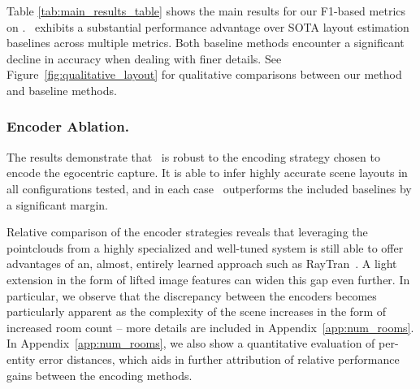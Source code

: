 Table \ref{tab:main_results_table} shows the main results for our F1-based metrics on \DatasetName{}. \METHOD~exhibits a substantial performance advantage over SOTA layout estimation baselines across multiple metrics. 
Both baseline methods encounter a significant decline in accuracy when dealing with finer details. See Figure~\ref{fig:qualitative_layout} for qualitative comparisons between our method and baseline methods. 


\subsubsection{Encoder Ablation.} 
The results demonstrate that \METHOD~is robust to the encoding strategy chosen to encode the egocentric capture. It is able to infer highly accurate scene layouts in all configurations tested, and in each case \METHOD~outperforms the included baselines by a significant margin. 

Relative comparison of the encoder strategies reveals that leveraging the pointclouds from a highly specialized and well-tuned system is still able to offer advantages of an, almost, entirely learned approach such as RayTran~\cite{tyszkiewicz2022raytran}. A light extension in the form of lifted image features can widen this gap even further. In particular, we observe that the discrepancy between the encoders becomes particularly apparent as the complexity of the scene increases in the form of increased room count -- more details are included in 
Appendix~\ref{app:num_rooms}.
In Appendix~\ref{app:num_rooms}, we also show a quantitative evaluation 
of per-entity error distances, which aids in further attribution of relative performance gains between the encoding methods.



